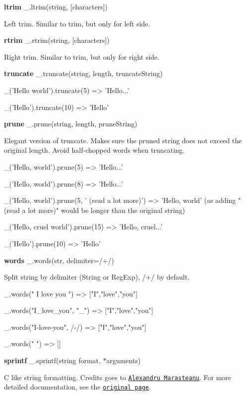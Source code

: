 {\bfseries ltrim} \+\_\+.\+ltrim(string, \mbox{[}characters\mbox{]})

Left trim. Similar to trim, but only for left side.

{\bfseries rtrim} \+\_\+.\+rtrim(string, \mbox{[}characters\mbox{]})

Right trim. Similar to trim, but only for right side.

{\bfseries truncate} \+\_\+.\+truncate(string, length, truncate\+String)


\begin{DoxyCode}
\_('Hello world').truncate(5)
=> 'Hello...'

\_('Hello').truncate(10)
=> 'Hello'
\end{DoxyCode}


{\bfseries prune} \+\_\+.\+prune(string, length, prune\+String)

Elegant version of truncate. Makes sure the pruned string does not exceed the original length. Avoid half-\/chopped words when truncating.


\begin{DoxyCode}
\_('Hello, world').prune(5)
=> 'Hello...'

\_('Hello, world').prune(8)
=> 'Hello...'

\_('Hello, world').prune(5, ' (read a lot more)')
=> 'Hello, world' (as adding "(read a lot more)" would be longer than the original string)

\_('Hello, cruel world').prune(15)
=> 'Hello, cruel...'

\_('Hello').prune(10)
=> 'Hello'
\end{DoxyCode}


{\bfseries words} \+\_\+.\+words(str, delimiter=/+/)

Split string by delimiter (String or Reg\+Exp), /+/ by default.


\begin{DoxyCode}
\_.words("   I   love   you   ")
=> ["I","love","you"]

\_.words("I\_love\_you", "\_")
=> ["I","love","you"]

\_.words("I-love-you", /-/)
=> ["I","love","you"]

\_.words("   ")
=> []
\end{DoxyCode}


{\bfseries sprintf} \+\_\+.\+sprintf(string format, $\ast$arguments)

C like string formatting. Credits goes to \href{http://www.diveintojavascript.com/projects/sprintf-for-javascript}{\tt Alexandru Marasteanu}. For more detailed documentation, see the \href{http://www.diveintojavascript.com/projects/sprintf-for-javascript}{\tt original page}.


